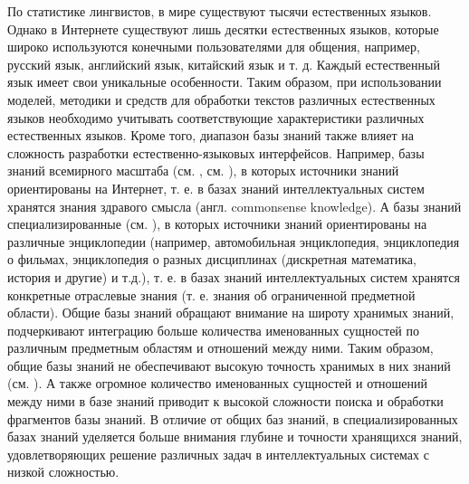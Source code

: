 По статистике лингвистов, в мире существуют тысячи естественных языков. Однако в Интернете существуют лишь десятки естественных языков, которые широко используются конечными пользователями для общения, например, русский язык, английский язык, китайский язык и т. д. Каждый естественный язык имеет свои уникальные особенности. Таким образом, при использовании моделей, методики и средств для обработки текстов различных естественных языков необходимо учитывать соответствующие характеристики различных естественных языков. Кроме того, диапазон базы знаний также влияет на сложность разработки естественно-языковых интерфейсов. Например, базы знаний всемирного масштаба (см. , см. ), в которых источники знаний ориентированы на Интернет, т. е. в базах знаний интеллектуальных систем хранятся знания здравого смысла (англ. commonsense knowledge). А базы знаний специализированные (см. ), в которых источники знаний ориентированы на различные энциклопедии (например, автомобильная энциклопедия, энциклопедия о фильмах, энциклопедия о разных дисциплинах (дискретная математика, история и другие) и т.д.), т. е. в базах знаний интеллектуальных систем хранятся конкретные отраслевые знания (т. е. знания об ограниченной предметной области). Общие базы знаний обращают внимание на широту хранимых знаний, подчеркивают интеграцию больше количества именованных сущностей по различным предметным областям и отношений между ними. Таким образом, общие базы знаний не обеспечивают высокую точность хранимых в них знаний (см. ). А также огромное количество именованных сущностей и отношений между ними в базе знаний приводит к высокой сложности поиска и обработки фрагментов базы знаний. В отличие от общих баз знаний, в специализированных базах знаний уделяется больше внимания глубине и точности хранящихся знаний, удовлетворяющих решение различных задач в интеллектуальных системах с низкой сложностью. 

